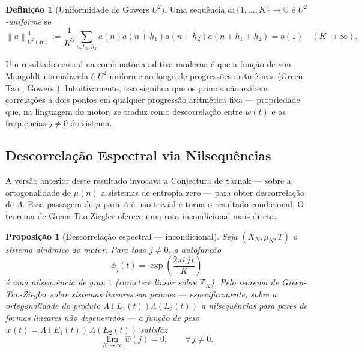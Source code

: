 \documentclass[12pt,a4paper]{article}
\newtheorem{proposition}[theorem]{Proposição}
\theoremstyle{definition}
\newtheorem{definition}[theorem]{Definição}
\newcommand{\Z}{\mathbb{Z}}
\newcommand{\C}{\mathbb{C}}
\newcommand{\norm}[1]{\left\| #1 \right\|}
\begin{document}
	\begin{definition}[Uniformidade de Gowers $U^2$]
		Uma sequência $a: \{1,\ldots,K\} \to \C$ é
		\emph{$U^2$-uniforme} se
		\[
		\norm{a}_{U^2(K)}^4 := \frac{1}{K^3}\sum_{n,h_1,h_2}
		a(n)\overline{a(n+h_1)}\overline{a(n+h_2)}a(n+h_1+h_2) = o(1)
		\quad (K \to \infty).
		\]
	\end{definition}
	
	Um resultado central na combinatória aditiva moderna é que a
	função de von Mangoldt normalizada é $U^2$-uniforme ao longo de
	progressões aritméticas (Green-Tao \cite{greentao}, Gowers
	\cite{gowers}). Intuitivamente, isso significa que os primos não
	exibem correlações a dois pontos em qualquer progressão aritmética
	fixa — propriedade que, na linguagem do motor, se traduz como
	descorrelação entre $w(t)$ e as frequências $j \neq 0$ do sistema.
	
	\subsection{Descorrelação Espectral via Nilsequências}
	
	A versão anterior deste resultado invocava a Conjectura de Sarnak
	\cite{sarnak} — sobre a ortogonalidade de $\mu(n)$ a sistemas de
	entropia zero — para obter descorrelação de $\Lambda$. Essa
	passagem de $\mu$ para $\Lambda$ é não trivial e torna o resultado
	condicional. O teorema de Green-Tao-Ziegler \cite{greentaoziegler}
	oferece uma rota incondicional mais direta.
	
	\begin{proposition}[Descorrelação espectral — incondicional]
		\label{prop:sarnak}
		Seja $(X_N, \mu_N, T)$ o sistema dinâmico do motor. Para todo
		$j \neq 0$, a autofunção
		\[
		\phi_j(t) = \exp\!\left(\frac{2\pi i\,j\,t}{K}\right)
		\]
		é uma nilsequência de grau $1$ (caractere linear sobre $\Z_K$).
		Pelo teorema de Green-Tao-Ziegler \cite{greentaoziegler} sobre
		sistemas lineares em primos — especificamente, sobre a
		ortogonalidade do produto $\Lambda(L_1(t))\Lambda(L_2(t))$ a
		nilsequências para pares de formas lineares não degenerados —
		a função de peso $w(t) = \Lambda(E_1(t))\,\Lambda(E_2(t))$
		satisfaz
		\[
		\lim_{K\to\infty}\widehat{w}(j) = 0,\qquad \forall\, j \neq 0.
		\]
	\end{proposition}
	
\end{document}
